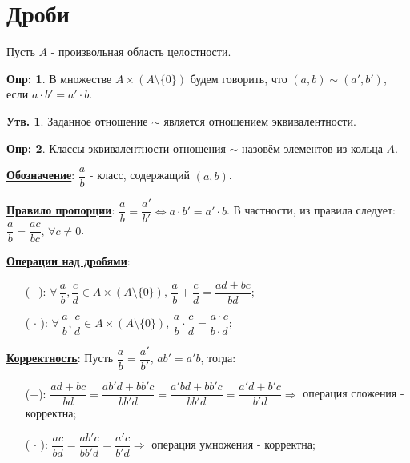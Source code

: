 \documentclass[12pt]{article}
\newcommand{\RN}[1]{%
	\textup{\uppercase\expandafter{\romannumeral#1}}%
}
\theoremstyle{definition}
\newtheorem{defn}{Опр:}
\newtheorem{prop}{Утв.}
\begin{document}
\lhead{Алгебра-\RN{1}}
\section*{Дроби}
Пусть $A$ - произвольная область целостности.
\begin{defn}
	В множестве $A \times \left(A\setminus \{0\}\right)$ будем говорить, что $(a,b) \sim (a',b')$, если $a{\cdot}b' = a'{\cdot}b$.
\end{defn}
\begin{prop}
	Заданное отношение $\sim$ является отношением эквивалентности.
\end{prop}

\begin{defn}
	Классы эквивалентности отношения $\sim$ назовём  элементов из кольца $A$.
\end{defn}

\textbf{\uline{Обозначение}}: $\dfrac{a}{b}$ - класс, содержащий $(a,b)$.

\textbf{\uline{Правило пропорции}}: $\dfrac{a}{b} = \dfrac{a'}{b'} \Leftrightarrow a{\cdot}b' = a'{\cdot}b$. В частности, из правила следует: $\dfrac{a}{b} = \dfrac{ac}{bc}, \, \forall c \neq 0$.

\textbf{\uline{Операции над дробями}}:
\begin{enumerate}
	\item[($+$):] $\forall \, \dfrac{a}{b}, \dfrac{c}{d} \in A \times \left(A\setminus \{0\}\right), \, \dfrac{a}{b} + \dfrac{c}{d} = \dfrac{ad + bc}{bd}$;
	\item[($\, \cdot\, $):] $\forall \,\dfrac{a}{b}, \dfrac{c}{d} \in A \times \left(A\setminus \{0\}\right), \, \dfrac{a}{b}{\cdot}\dfrac{c}{d} = \dfrac{a{\cdot}c}{b{\cdot}d}$;
\end{enumerate}
\textbf{\uline{Корректность}}: Пусть $\dfrac{a}{b} = \dfrac{a'}{b'}, \, ab' = a'b$, тогда: 
\begin{enumerate}
	\item[($+$):] $\dfrac{ad + bc}{bd} = \dfrac{ab'd + bb'c}{bb'd} = \dfrac{a'bd + bb'c}{bb'd} = \dfrac{a'd + b'c}{b'd} \Rightarrow$ операция сложения - корректна;
	\item[($\, \cdot\, $):] $\dfrac{ac}{bd} = \dfrac{ab'c}{bb'd} = \dfrac{a'c}{b'd} \Rightarrow$ операция умножения - корректна;
\end{enumerate}
\end{document}
